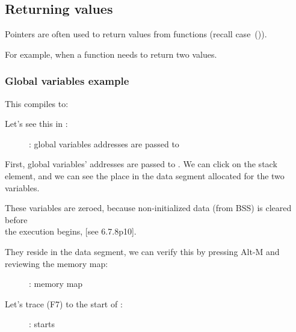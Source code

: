\subsection{Returning values}

Pointers are often used to return values from functions (recall \scanf case~()).

For example, when a function needs to return two values.

\subsubsection{Global variables example}



This compiles to:



\myindex{\olly}
\clearpage
Let's see this in \olly:

\begin{figure}[H]
\centering
{}
\caption{\olly: 
global variables addresses are passed to \ttfone}
\label{fig:pointers_olly_global_1}
\end{figure}

First, global variables' addresses are passed to \ttfone.
We can click  
on the stack element, and we can see the place in the data segment allocated 
for the two variables.

\clearpage
These variables are zeroed, because non-initialized data (from \ac{BSS}) is cleared before\\
the execution begins, [see \CNineNineStd{} 6.7.8p10].

They reside in the data segment, we can verify this by pressing Alt-M and reviewing the memory map:

\begin{figure}[H]
\centering
{}
\caption{\olly: memory map}
\label{fig:pointers_olly_global_5}
\end{figure}

\clearpage
Let's trace (F7) to the start of \ttfone: 

\begin{figure}[H]
\centering
{}
\caption{\olly: \ttfone starts}
\label{fig:pointers_olly_global_2}
\end{figure}

